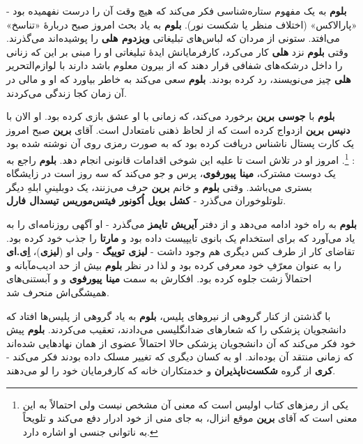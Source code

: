 \documentclass[12pt]{book}
\newcommand{\noun}[1]{{\textbf{#1}}}
\begin{document}
    \noun{بلوم} به یک مفهوم ستاره‌شناسی فکر می‌کند که هیچ وقت آن را درست نفهمیده بود - «پارالاکس» (اختلاف منظر یا شکست نور). \noun{بلوم} به یاد بحث امروز صبح دربارهٔ «تناسخ» می‌افتد. ستونی از مردان که لباس‌های تبلیغاتی \noun{ویزدوم هلی} را پوشیده‌اند می‌گذرند. وقتی \noun{بلوم} نزد \noun{هلی} کار می‌کرد، کارفرمایانش ایدهٔ تبلیغاتی او را مبنی بر این که زنانی را داخل درشکه‌های شفافی قرار دهند که از بیرون معلوم باشد دارند با لوازم‌التحریر \noun{هلی} چیز می‌نویسند، رد کرده بودند. \noun{بلوم} سعی می‌کند به خاطر بیاورد که او و مالی در آن زمان کجا زندگی می‌کردند.

    \noun{بلوم} با \noun{جوسی برین} برخورد می‌کند، که زمانی با او عشق بازی کرده بود. او الان با \noun{دنیس برین} ازدواج کرده است که از لحاظ ذهنی نامتعادل است. آقای \noun{برین} صبح امروز یک کارت پستال ناشناس دریافت کرده بود که به صورت رمزی روی آن نوشته شده بود : \footnote{ یکی از رمزهای کتاب اولیس است که معنی آن مشخص نیست ولی احتمالاً به این معنی است که آقای \noun{برین} موقع انزال، به جای منی از خود ادرار دفع می‌کند و تلویحاً به ناتوانی جنسی او اشاره دارد.}. امروز او در تلاش است تا علیه این شوخی اقدامات قانونی انجام دهد. \noun{بلوم} راجع به یک دوست مشترک، \noun{مینا پیورفوی}، پرس و جو می‌کند که سه روز است در زایشگاه بستری می‌باشد. وقتی \noun{بلوم} و خانم \noun{برین} حرف می‌زنند، یک دوبلینیِ ابلهِ دیگر تلوتلوخوران می‌گذرد - \noun{کشل بویل اُکونور فیتس‌موریس تیسدال فارل}.

    \noun{بلوم} به راه خود ادامه می‌دهد و از دفتر \noun{آیریش تایمز} می‌گذرد - او آگهی روزنامه‌ای را به یاد می‌آورد که برای استخدام یک بانوی تایپیست داده بود و \noun{مارتا} را جذب خود کرده بود. تقاضای کار از طرف کس دیگری هم وجود داشت - \noun{لیزی توییگ} - ولی او (\noun{لیزی})، \noun{اِی.ای} را به عنوان معرّفِ خود معرفی کرده بود و لذا در نظر \noun{بلوم} بیش از حد ادیب‌مآبانه و احتمالاً زشت جلوه کرده بود. افکارش به سمت \noun{مینا پیورفوی} و و آبستنی‌های همیشگی‌اش منحرف شد.

    با گذشتن از کنار گروهی از نیروهای پلیس، \noun{بلوم} به یاد گروهی از پلیس‌ها افتاد که دانشجویان پزشکی را که شعارهای ضدانگلیسی می‌دادند، تعقیب می‌کردند. \noun{بلوم} پیش خود فکر می‌کند که آن دانشجویان پزشکی حالا احتمالاً عضوی از همان نهادهایی شده‌اند که زمانی منتقد آن بوده‌اند. او به کسان دیگری که تغییر مسلک داده بودند فکر می‌کند - \noun{کری} از گروه \noun{شکست‌ناپذیران} و خدمتکاران خانه که کارفرمایان خود را لو می‌دهند.
\end{document}
